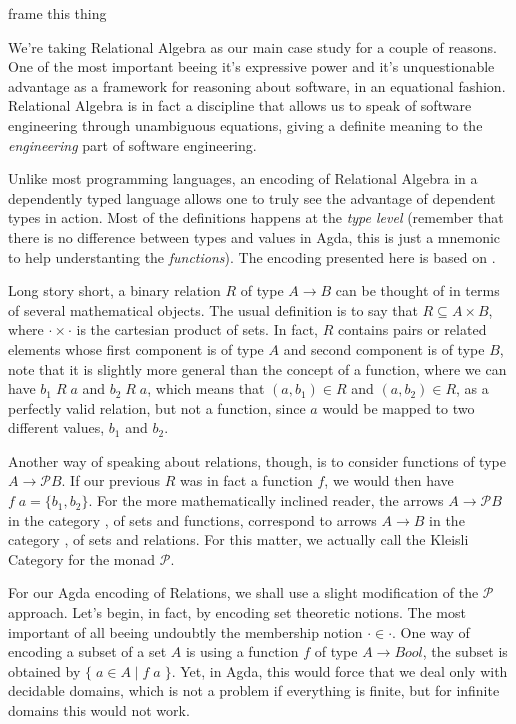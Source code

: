 \begin{TODO}
  \item frame this thing
\end{TODO}

We're taking Relational Algebra\cite{Bird97} as our main case study for a couple of reasons. One of the most
important beeing it's expressive power and it's unquestionable advantage as a framework for
reasoning about software, in an equational fashion. Relational Algebra is in fact a discipline that
allows us to speak of software engineering through unambiguous equations, giving a definite meaning
to the \emph{engineering} part of software engineering.

Unlike most programming languages, an encoding of Relational Algebra in a dependently typed 
language allows one to truly see the advantage of dependent types in action. Most of the definitions
happens at the \emph{type level} (remember that there is no difference between types and values in Agda,
this is just a mnemonic to help understanting the \emph{functions}). The encoding presented
here is based on \cite{Jansson09}.

Long story short, a binary relation $R$ of type $A \rightarrow B$ can be thought of in terms of several mathematical objects.
The usual definition is to say that $R \subseteq A \times B$, where $\cdot\times\cdot$ is the cartesian product of sets.
In fact, $R$ contains pairs or related elements whose first component is of type $A$ and second component is of type $B$,
note that it is slightly more general than the concept of a function, where we can have $b_1\;R\;a$ and $b_2\;R\;a$, which means
that $(a, b_1) \in R$ and $(a, b_2) \in R$, as a perfectly valid relation, but not a function, since $a$ would be mapped to two different values, $b_1$ and $b_2$.

\newcommand{\powerset}{\mathcal{P}}
Another way of speaking about relations, though, is to consider functions of type $A \rightarrow \powerset B$.
If our previous $R$ was in fact a function $f$, we would then have $f\; a = \{b_1, b_2\}$. For the more
mathematically inclined reader, the arrows $A \rightarrow \powerset B$ in the category , of sets and
functions, correspond to arrows $A \rightarrow B$ in the category , of sets and relations. For this matter,
we actually call  the Kleisli Category for the monad $\powerset$. 

For our Agda encoding of Relations, we shall use a slight modification of the $\powerset$ approach.
Let's begin, in fact, by encoding set theoretic notions. The most important of all beeing undoubtly
the membership notion $\cdot \in \cdot$. One way of encoding a subset of a set $A$ is using a function $f$
of type $A \rightarrow Bool$, the subset is obtained by $\{\; a \in A\; |\; f\;a\; \}$. Yet, in Agda, this would
force that we deal only with decidable domains, which is not a problem if everything is finite, but
for infinite domains this would not work.

